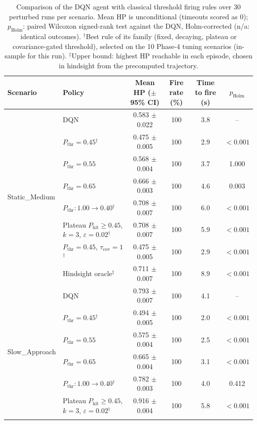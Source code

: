\begin{table}[htbp]
\centering
\caption{Comparison of the DQN agent with classical threshold firing rules over 30 perturbed runs per scenario. Mean HP is unconditional (timeouts scored as 0); $p_{\mathrm{Holm}}$: paired Wilcoxon signed-rank test against the DQN, Holm-corrected (n/a: identical outcomes). $^{\dagger}$Best rule of its family (fixed, decaying, plateau or covariance-gated threshold), selected on the 10 Phase-4 tuning scenarios (in-sample for this run). $^{\ddagger}$Upper bound: highest HP reachable in each episode, chosen in hindsight from the precomputed trajectory.}
\label{tab:comparison-traditional-rl}
\small
\begin{tabular}{llcccc}
\toprule
\textbf{Scenario} & \textbf{Policy} & \textbf{Mean HP ($\pm$95\% CI)} & \textbf{Fire rate (\%)} & \textbf{Time to fire (s)} & $p_{\mathrm{Holm}}$ \\
\midrule
\multirow{8}{*}{Static\_Medium} & DQN & 0.583 $\pm$ 0.022 & 100 & 3.8 & -- \\
 & $P_{\mathrm{thr}}=0.45$$^{\dagger}$ & 0.475 $\pm$ 0.005 & 100 & 2.9 & $<0.001$ \\
 & $P_{\mathrm{thr}}=0.55$ & 0.568 $\pm$ 0.004 & 100 & 3.7 & 1.000 \\
 & $P_{\mathrm{thr}}=0.65$ & 0.666 $\pm$ 0.003 & 100 & 4.6 & 0.003 \\
 & $P_{\mathrm{thr}}: 1.00 \to 0.40$$^{\dagger}$ & 0.708 $\pm$ 0.007 & 100 & 6.0 & $<0.001$ \\
 & Plateau $P_{\mathrm{hit}}\geq0.45$, $k=3$, $\varepsilon=0.02$$^{\dagger}$ & 0.708 $\pm$ 0.007 & 100 & 5.9 & $<0.001$ \\
 & $P_{\mathrm{thr}}=0.45$, $\tau_{\mathrm{cov}}=1$$^{\dagger}$ & 0.475 $\pm$ 0.005 & 100 & 2.9 & $<0.001$ \\
 & Hindsight oracle$^{\ddagger}$ & 0.711 $\pm$ 0.007 & 100 & 8.9 & $<0.001$ \\
\midrule
\multirow{8}{*}{Slow\_Approach} & DQN & 0.793 $\pm$ 0.007 & 100 & 4.1 & -- \\
 & $P_{\mathrm{thr}}=0.45$$^{\dagger}$ & 0.494 $\pm$ 0.005 & 100 & 2.0 & $<0.001$ \\
 & $P_{\mathrm{thr}}=0.55$ & 0.575 $\pm$ 0.004 & 100 & 2.5 & $<0.001$ \\
 & $P_{\mathrm{thr}}=0.65$ & 0.665 $\pm$ 0.004 & 100 & 3.1 & $<0.001$ \\
 & $P_{\mathrm{thr}}: 1.00 \to 0.40$$^{\dagger}$ & 0.782 $\pm$ 0.003 & 100 & 4.0 & 0.412 \\
 & Plateau $P_{\mathrm{hit}}\geq0.45$, $k=3$, $\varepsilon=0.02$$^{\dagger}$ & 0.916 $\pm$ 0.004 & 100 & 5.8 & $<0.001$ \\
$$
\end{tabular}
\end{table}
